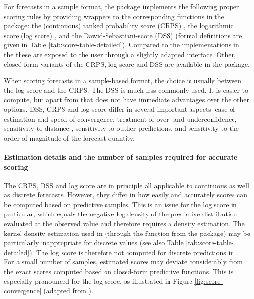 \documentclass[
]{jss}
\begin{document}
For forecasts in a sample format, the  package
implements the following proper scoring rules by providing wrappers to
the corresponding functions in the  package: the
(continuous) ranked probability score (CRPS)
\citep{epsteinScoringSystemProbability1969, murphyNoteRankedProbability1971a, mathesonScoringRulesContinuous1976, gneitingStrictlyProperScoring2007},
the logarithmic score (log score) \citep{goodRationalDecisions1952}, and
the Dawid-Sebastiani-score (DSS)
\citep{dawidCoherentDispersionCriteria1999} (formal definitions are
given in Table \ref{tab:score-table-detailed}). Compared to the
implementations in the  these are exposed to the user
through a slightly adapted interface. Other, closed form variants of the
CRPS, log score and DSS are available in the  package.

When scoring forecasts in a sample-based format, the choice is usually
between the log score and the CRPS. The DSS is much less commonly used.
It is easier to compute, but apart from that does not have immediate
advantages over the other options. DSS, CRPS and log score differ in
several important aspects: ease of estimation and speed of convergence,
treatment of over- and underconfidence, sensitivity to distance
\cite{winklerScoringRulesEvaluation1996}, sensitivity to outlier
predictions, and sensitivity to the order of magnitude of the forecast
quantity.

\hypertarget{estimation-details-and-the-number-of-samples-required-for-accurate-scoring}{%
\paragraph{Estimation details and the number of samples required for
accurate
scoring}\label{estimation-details-and-the-number-of-samples-required-for-accurate-scoring}}

The CRPS, DSS and log score are in principle all applicable to
continuous as well as discrete forecasts. However, they differ in how
easily and accurately scores can be computed based on predictive
samples. This is an issue for the log score in particular, which equals
the negative log density of the predictive distribution evaluated at the
observed value and therefore requires a density estimation. The kernel
density estimation used in  (through the function
 from the  package) may be
particularly inappropriate for discrete values (see also Table
\ref{tab:score-table-detailed}). The log score is therefore not computed
for discrete predictions in . For a small number of
samples, estimated scores may deviate considerably from the exact scores
computed based on closed-form predictive functions. This is especially
pronounced for the log score, as illustrated in Figure
\ref{fig:score-convergence} (adapted from
\citep{jordanEvaluatingProbabilisticForecasts2019}).
\end{document}
